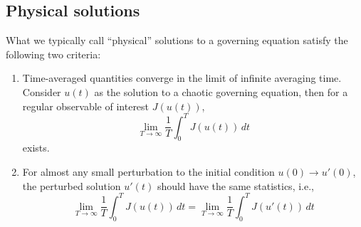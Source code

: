 \subsection{Physical solutions}
What we typically call ``physical'' solutions to a governing equation satisfy the following
two criteria: 
\begin{enumerate}
    \item Time-averaged quantities converge in the limit of infinite averaging time.
    Consider $u(t)$ as the solution to a chaotic governing equation, then for a regular observable
    of interest $J(u(t))$,
    \begin{equation} \label{longtimeavg}
        \lim_{T\to\infty}\frac1T \int_0^T J(u(t))\,dt
    \end{equation}
    exists.
    \item For almost any small perturbation to the initial condition $u(0)\to u'(0)$, the perturbed
    solution $u'(t)$ should have the same statistics, i.e.,
    \begin{equation}
        \lim_{T\to\infty}\frac1T \int_0^T J(u(t))\,dt
      = \lim_{T\to\infty}\frac1T \int_0^T J(u'(t))\,dt
    \end{equation}
\end{enumerate}

